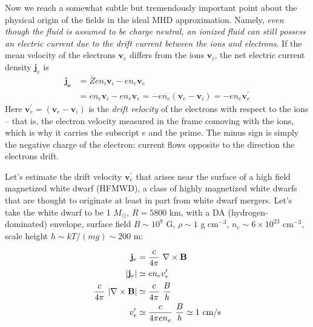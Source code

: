 \documentclass[notoc]{tufte-handout}
\renewcommand{\vec}[1]{\mathbf{#1}}
\newcommand{\del}{\vec{\nabla}}
\newcommand{\B}{\vec{B}}
\begin{document}
Now we reach a somewhat subtle but tremendously important point about the physical origin of the fields in the ideal MHD approximation. Namely, {\it even though the fluid is assumed to be charge neutral, an ionized fluid can still possess an electric current due to the drift current between the ions and electrons}. If the mean velocity of the electrons $\vec{v}_e$ differs from the ions $\vec{v}_i$, the net electric current density $\vec {j}_e$ is
\begin{align}
\vec{j_e} & = \bar {Z}en_i \vec{v}_i - en_e \vec{v}_e \\
& = en_e \vec{v}_i - en_e\vec{v}_e = -en_e (\vec{v}_e - \vec{v}_i) = -en_e \vec{v}_e^\prime
\end{align}
%
Here $\vec{v}_e^\prime =  (\vec{v}_e - \vec{v}_i)$ is the {\it drift velocity} of the electrons with respect to the ions -- that is, the electron velocity measured in the frame comoving with the ions, which is why it carries the subscript $e$ and the prime. The minus sign is simply the negative charge of the electron: current flows opposite to the direction the electrons drift.

Let's estimate the drift velocity $\vec{v}_e^\prime$ that arises near the surface of a high field magnetized white dwarf (HFMWD), a class of highly magnetized white dwarfs that are thought to originate at least in part from white dwarf mergers. Let's take the white dwarf to be 1 $M_{\odot}$, $R = 5800$ km, with a  DA (hydrogen-dominated) envelope,  surface field $B \sim 10^9$ G, $\rho \sim 1$ g cm$^{-3}$, $n_e \sim 6 \times 10^{23}$ cm$^{-3}$, scale height $h \sim k T /  (m g) \sim 200$ m:

\begin{align}
\vec{j}_e & = \frac{c}{4\pi} ~\del \times \B  \\
\abs{\vec{j}_e} & \simeq e n_e {v}_e^\prime \\
\frac{c}{4\pi}~\abs{\del \times \B} & \simeq \frac{c}{4\pi}~\frac{B}{h} \\
v_e^\prime &\simeq \frac{c}{4\pi e n_e}~\frac{B}{h} \simeq 1 ~\text{cm/s}
\end{align}
%
\end{document}
